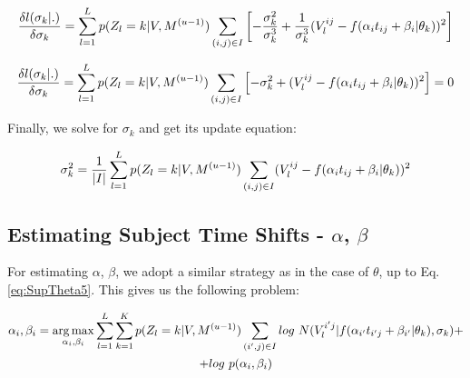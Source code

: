 \begin{equation}
 \frac{\delta l(\sigma_k|.)}{\delta \sigma_k} =  \sum_{l=1}^L p(Z_l = k | V, M^{(u-1)}) \sum_{(i,j) \in I} \left[ - \frac{\sigma_k^2}{\sigma_k^3} + \frac{1}{\sigma_k^3}(V_l^{ij} - f(\alpha_i t_{ij} + \beta_i | \theta_k))^2 \right]
\end{equation}

\begin{equation}
 \frac{\delta l(\sigma_k|.)}{\delta \sigma_k} =  \sum_{l=1}^L p(Z_l = k | V, M^{(u-1)}) \sum_{(i,j) \in I} \left[ - \sigma_k^2 + (V_l^{ij} - f(\alpha_i t_{ij} + \beta_i | \theta_k))^2 \right] = 0
\end{equation}


Finally, we solve for $\sigma_k$ and get its update equation: 

\begin{equation}
\label{eq:SupThetaFinal}
 \sigma_k^2 = \frac{1}{|I|} \sum_{l=1}^L p(Z_l = k | V, M^{(u-1)}) \sum_{(i,j) \in I} (V_l^{ij} - f(\alpha_i t_{ij} + \beta_i | \theta_k))^2
\end{equation}

% 


\subsection{Estimating Subject Time Shifts - $\alpha$, $\beta$}

For estimating $\alpha$, $\beta$, we adopt a similar strategy as in the case of $\theta$, up to Eq. \ref{eq:SupTheta5}. This gives us the following problem:

\begin{multline}
 \alpha_i, \beta_i = \operatorname*{arg\,max}_{\alpha_i, \beta_i} \sum_{l=1}^L \sum_{k = 1}^K p(Z_l = k | V, M^{(u-1)}) \sum_{(i',j) \in I} log\ N(V_l^{i'j} | f(\alpha_{i'} t_{i'j} + \beta_{i'} | \theta_{k}), \sigma_{k}) + \\ + log\ p(\alpha_i, \beta_i)
\end{multline}

